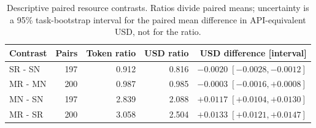 \begin{table}[htbp]\centering\small
\caption{Descriptive paired resource contrasts. Ratios divide paired means; uncertainty is a 95\% task-bootstrap interval for the paired mean difference in API-equivalent USD, not for the ratio.}\label{tab:heldout-resource-contrasts}
\begin{tabular}{lrrrr}\toprule
Contrast & Pairs & Token ratio & USD ratio & USD difference [interval]\\
\midrule
SR - SN & 197 & 0.912 & 0.816 & $-0.0020\;[-0.0028,-0.0012]$\\
MR - MN & 200 & 0.987 & 0.985 & $-0.0003\;[-0.0016,+0.0008]$\\
MN - SN & 197 & 2.839 & 2.088 & $+0.0117\;[+0.0104,+0.0130]$\\
MR - SR & 200 & 3.058 & 2.504 & $+0.0133\;[+0.0121,+0.0147]$\\
\bottomrule\end{tabular}\end{table}
